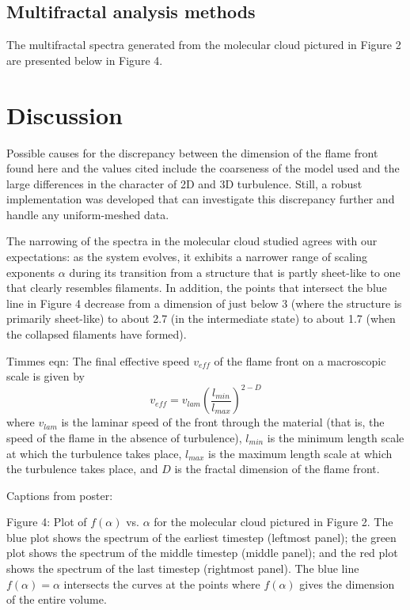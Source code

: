 \documentclass[iop]{emulateapj}
\newcommand{\TODO}[1]{\todo[inline]{#1}}
\begin{document}
\subsection{Multifractal analysis methods}\label{MultifractalResults}
The multifractal spectra generated from the molecular cloud pictured in Figure 2 are presented below in Figure 4.

\section{Discussion}\label{Discussion}
Possible causes for the discrepancy between the dimension of the flame front found here and the values cited include the coarseness of the model used and the large differences in the character of 2D and 3D turbulence. Still, a robust implementation was developed that can investigate this discrepancy further and handle any uniform-meshed data.
 
The narrowing of the spectra in the molecular cloud studied agrees with our expectations: as the system evolves, it exhibits a narrower range of scaling exponents $ \alpha $ during its transition from a structure that is partly sheet-like to one that clearly resembles filaments. In addition, the points that intersect the blue line in Figure 4 decrease from a dimension of just below 3 (where the structure is primarily sheet-like) to about 2.7 (in the intermediate state) to about 1.7 (when the collapsed filaments have formed).


Timmes eqn:
	The final effective speed $v_{eff}$ of the flame front on a macroscopic scale is given by
	\begin{equation} 
	v_{eff} = v_{lam} \left(\frac{l_{min}}{l_{max}}\right)^{2 - D}
	\end{equation}
	where $v_{lam}$ is the laminar speed of the front through the material (that is, the speed of the flame in the absence of turbulence), $l_{min}$ is the minimum length scale at which the turbulence takes place, $l_{max}$ is the maximum length scale at which the turbulence takes place, and $ D $ is the fractal dimension of the flame front.

Captions from poster:\TODO{integrate this into the paper}

	Figure 4: Plot of $f(\alpha)$ vs. $\alpha$ for the molecular cloud pictured in Figure 2. The blue plot shows the spectrum of the earliest timestep (leftmost panel); the green plot shows the spectrum of the middle timestep (middle panel); and the red plot shows the spectrum of the last timestep (rightmost panel). The blue line $f(\alpha) = \alpha $ intersects the curves at the points where $f(\alpha)$ gives the dimension of the entire volume.
\end{document}
